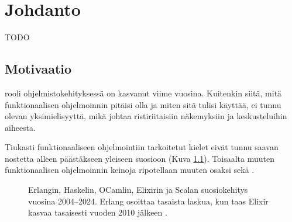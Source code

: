 
\chapter{Johdanto}

TODO

\section{Motivaatio}

 rooli ohjelmistokehityksessä on kasvanut viime vuosina. Kuitenkin siitä, mitä funktionaalisen ohjelmoinnin pitäisi olla ja miten sitä tulisi käyttää, ei tunnu olevan yksimielisyyttä, mikä johtaa ristiriitaisiin näkemyksiin ja keskusteluihin aiheesta.

Tiukasti funktionaaliseen ohjelmointiin tarkoitetut kielet eivät tunnu saavan nostetta alleen päästäkseen yleiseen suosioon (Kuva \ref{fig:fplangpopularity}).  Toisaalta muuten funktionaalisen ohjelmoinnin keinoja ripotellaan muuten osaksi  sekä .



\begin{figure}[htbp]
    \datatable

    \pgfplotstablegetrowsof{\datatable} %
    \centering
    \caption{Erlangin, Haskelin, OCamlin, Elixirin ja Scalan suosiokehitys vuosina 2004–2024. Erlang osoittaa tasaista laskua, kun taas Elixir kasvaa tasaisesti vuoden 2010 jälkeen \cite{fplanggoogletrend}.}
    \label{fig:fplangpopularity}
\end{figure}

